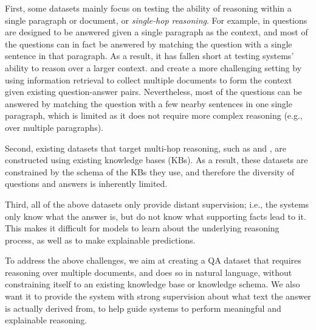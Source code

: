 First, some datasets mainly focus on testing the ability of reasoning within a single paragraph or document, or \emph{single-hop reasoning}.
For example, in \squad{} \cite{rajpurkar2016squad} questions are designed to be answered given a single paragraph as the context, and most of the questions can in fact be answered by matching the question with a single sentence in that paragraph.
As a result, it has fallen short at testing systems' ability to reason over a larger context.
\triviaqa{} \cite{Joshi2017TriviaQA} and \searchqa{} \cite{dunn2017searchqa} create a more challenging setting by using information retrieval to collect multiple documents to form the context given existing question-answer pairs.
Nevertheless, most of the questions can be answered by matching the question with a few nearby sentences in one single paragraph, which is limited as it does not require more complex reasoning (e.g., over multiple paragraphs).

Second, existing datasets that target multi-hop reasoning, such as \wikihop{} \cite{welbl2017constructing} and \complexwebq{} \cite{talmor2018web}, are constructed using existing knowledge bases (KBs). As a result, these datasets are constrained by the schema of the KBs they use, and therefore the diversity of questions and answers is inherently limited.

Third, all of the above datasets only provide distant supervision; i.e., the systems only know what the answer is, but do not know what supporting facts lead to it. This makes it difficult for models to learn about the underlying reasoning process, as well as to make explainable predictions.

To address the above challenges, we aim at creating a QA dataset that requires reasoning over multiple documents, and does so in natural language, without constraining itself to an existing knowledge base or knowledge schema.
We also want it to provide the system with strong supervision about what text the answer is actually derived from, to help guide systems to perform meaningful and explainable reasoning.



